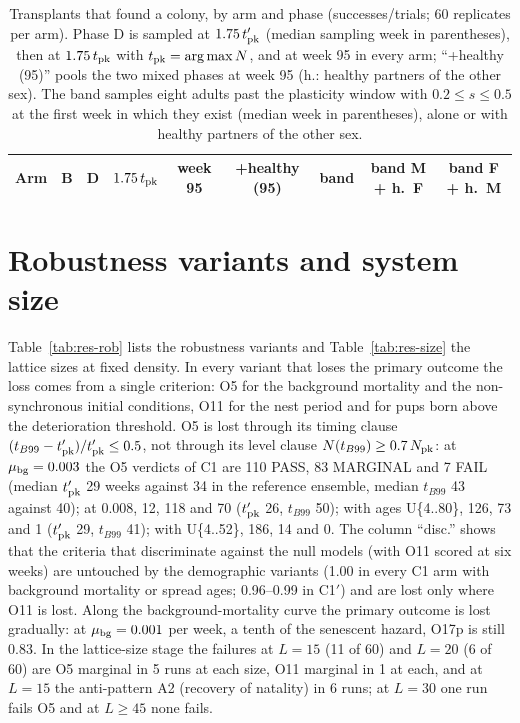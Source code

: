 \documentclass[pre,onecolumn,superscriptaddress,notitlepage]{revtex4-2}
\begin{document}
\begin{table}[ht]
\centering
\caption{Transplants that found a colony, by arm and phase (successes/trials; 60 replicates per arm). Phase D is
sampled at $1.75\,t'_{\rm pk}$ (median sampling week in parentheses), then at $1.75\,t_{\rm pk}$ with
$t_{\rm pk}=\arg\max N$, and at week 95 in every arm; ``+healthy (95)'' pools the two mixed phases at week 95 (h.:
healthy partners of the other sex). The band samples eight adults past the plasticity window with $0.2\le s\le0.5$
at the first week in which they exist (median week in parentheses), alone or with healthy partners of the other
sex.}
\label{tab:res-trans}
\footnotesize
\setlength{\tabcolsep}{4pt}
\begin{tabular}{@{}lcccccccc@{}}
\toprule
Arm & B & D & $1.75\,t_{\rm pk}$ & week 95 & +healthy (95) & band & band M + h.\ F & band F + h.\ M \\
\midrule

\end{tabular}
\end{table}

\section{Robustness variants and system size}
\label{supp:robustness}

Table~\ref{tab:res-rob} lists the robustness variants and Table~\ref{tab:res-size} the lattice sizes at fixed
density. In every variant that loses the primary outcome the loss comes from a single criterion: O5 for the
background mortality and the non-synchronous initial conditions, O11 for the nest period and for pups born above
the deterioration threshold. O5 is lost through its timing clause $(t_{B99}-t'_{\rm pk})/t'_{\rm pk}\le0.5$, not
through its level clause $N(t_{B99})\ge0.7\,N_{\rm pk}$: at $\mu_{\rm bg}=0.003$ the O5 verdicts of \textsf{C1} are
110 PASS, 83 MARGINAL and 7 FAIL (median $t'_{\rm pk}$ 29 weeks against 34 in the reference ensemble, median
$t_{B99}$ 43 against 40); at 0.008, 12, 118 and 70 ($t'_{\rm pk}$ 26, $t_{B99}$ 50); with ages U\{4..80\}, 126, 73
and 1 ($t'_{\rm pk}$ 29, $t_{B99}$ 41); with U\{4..52\}, 186, 14 and 0. The column ``disc.'' shows that the
criteria that discriminate against the null models (with O11 scored at six weeks) are untouched by the
demographic variants (1.00 in every \textsf{C1} arm with background mortality or spread ages; 0.96--0.99 in
\textsf{C1}$'$) and are lost only where O11 is lost. Along the background-mortality curve the primary outcome is
lost gradually: at $\mu_{\rm bg}=0.001$ per week, a tenth of the senescent hazard, O17p is still 0.83. In the
lattice-size stage the failures at $L=15$ (11 of 60) and $L=20$ (6 of 60) are O5 marginal in 5 runs at each size,
O11 marginal in 1 at each, and at $L=15$ the anti-pattern A2 (recovery of natality) in 6 runs; at $L=30$ one run
fails O5 and at $L\ge45$ none fails.
\end{document}
